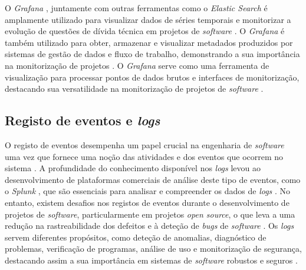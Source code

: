 O \textit{Grafana} \cite{grafana}, juntamente com outras ferramentas como o \textit{Elastic Search}
\cite{elastic-search} é amplamente utilizado para visualizar dados de séries temporais e monitorizar
a evolução de questões de dívida técnica em projetos de \textit{software} \cite{metrics2019b}. O 
\textit{Grafana} é também utilizado para obter, armazenar e visualizar metadados produzidos por 
sistemas de gestão de dados e fluxo de trabalho, demonstrando a sua importância na monitorização 
de projetos \cite{metrics2021}. O \textit{Grafana} serve como uma ferramenta de visualização para 
processar pontos de dados brutos e interfaces de monitorização, destacando sua versatilidade na 
monitorização de projetos de \textit{software} \cite{metrics2022}.

\subsection{Registo de eventos e \textit{logs}}

O registo de eventos desempenha um papel crucial na engenharia de \textit{software} uma vez que 
fornece uma noção das atividades e dos eventos que ocorrem no sistema \cite{logs2022}. A profundidade 
do conhecimento disponível nos \textit{logs} levou ao desenvolvimento de plataformas comerciais de 
análise deste tipo de eventos, como o \textit{Splunk} \cite{splunk}, que são essenciais para 
analisar e compreender os dados de \textit{logs} \cite{logs2021}. No entanto, existem desafios nos 
registos de eventos durante o desenvolvimento de projetos de \textit{software}, particularmente em 
projetos \textit{open source}, o que leva a uma redução na rastreabilidade dos defeitos e à
deteção de \textit{bugs} de \textit{software} \cite{logs2018}. Os \textit{logs} servem diferentes 
propósitos, como deteção de anomalias, diagnóstico de problemas, verificação de programas, análise 
de uso e monitorização  de segurança, destacando assim a sua importância em sistemas de
\textit{software} robustos e seguros \cite{logs2019}.

